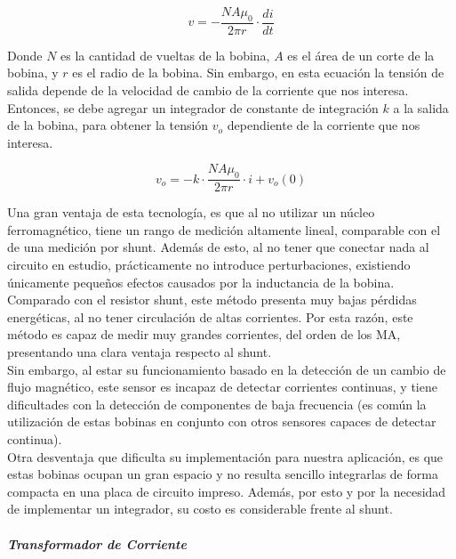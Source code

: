 \begin{equation*}
    v = -\frac{NA\mu_0}{2\pi r}\cdot \frac{di}{dt}
\end{equation*}

Donde $N$ es la cantidad de vueltas de la bobina, $A$ es el área de un corte de la bobina, y $r$ es el radio de la bobina. Sin embargo, en esta ecuación la tensión de salida depende de la velocidad de cambio de la corriente que nos interesa. Entonces, se debe agregar un integrador de constante de integración $k$ a la salida de la bobina, para obtener la tensión $v_o$ dependiente de la corriente que nos interesa.

\begin{equation}\label{ec_rogowski}
    v_o = -k\cdot\frac{NA\mu_0}{2\pi r}\cdot i + v_o(0)
\end{equation}

Una gran ventaja de esta tecnología, es que al no utilizar un núcleo ferromagnético, tiene un rango de medición {\Medium altamente lineal}, comparable con el de una medición por shunt. Además de esto, al no tener que conectar nada al circuito en estudio, prácticamente {\Medium no introduce perturbaciones}, existiendo únicamente pequeños efectos causados por la inductancia de la bobina.\\

Comparado con el resistor shunt, este método presenta muy {\Medium bajas pérdidas} energéticas, al no tener circulación de altas corrientes. Por esta razón, este método es capaz de medir muy {\Medium grandes corrientes}, del orden de los \unit{\mega\ampere}, presentando una clara ventaja respecto al shunt.\\

Sin embargo, al estar su funcionamiento basado en la detección de un cambio de flujo magnético, este sensor es {\Medium incapaz de detectar corrientes continuas}, y tiene dificultades con la detección de componentes de baja frecuencia (es común la utilización de estas bobinas en conjunto con otros sensores capaces de detectar continua).\\

Otra desventaja que dificulta su implementación para nuestra aplicación, es que estas bobinas {\Medium ocupan un gran espacio} y no resulta sencillo integrarlas de forma compacta en una placa de circuito impreso. Además, por esto y por la necesidad de implementar un integrador, su costo es considerable frente al shunt.\\

\subparagraph{Transformador de Corriente}

